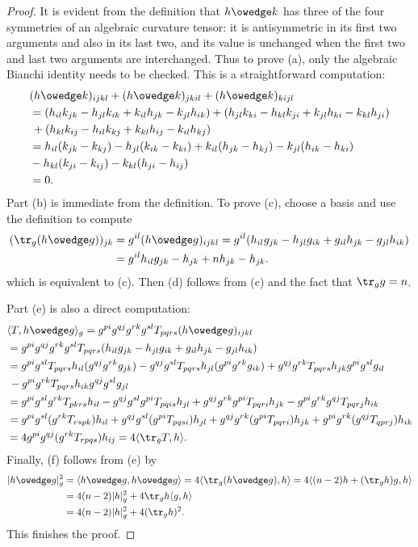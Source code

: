 \begin{proof}
It is evident from the definition that $h\owedge k$ has three of the four symmetries of an algebraic curvature tensor: it is antisymmetric in its first two arguments 
and also in its last two, and its value is unchanged when the first two and last two arguments are interchanged. Thus to prove (a), only the algebraic Bianchi 
identity needs to be checked. This is a straightforward computation:
\begin{align*}
&(h\owedge k)_{ijkl}+(h\owedge k)_{jkil}+(h\owedge k)_{kijl}\\
&=(h_{il}k_{jk}-h_{jl}k_{ik}+k_{il}h_{jk}-k_{jl}h_{ik})+(h_{jl}k_{ki}-h_{kl}k_{ji}+k_{jl}h_{ki}-k_{kl}h_{ji})\\
&\,+(h_{kl}k_{ij}-h_{il}k_{kj}+k_{kl}h_{ij}-k_{il}h_{kj})\\
&=h_{il}(k_{jk}-k_{kj})-h_{jl}(k_{ik}-k_{ki})+k_{il}(h_{jk}-h_{kj})-k_{jl}(h_{ik}-h_{ki})\\
&-h_{kl}(k_{ji}-k_{ij})-k_{kl}(h_{ji}-h_{ij})\\
&=0.
\end{align*}
Part (b) is immediate from the definition. To prove (c), choose a basis and use the definition to compute
\begin{align*}
(\tr_g(h\owedge g))_{jk}&=g^{il}(h\owedge g)_{ijkl}=g^{il}(h_{il}g_{jk}-h_{jl}g_{ik}+g_{il}h_{jk}-g_{jl}h_{ik})\\
&=g^{il}h_{il}g_{jk}-h_{jk}+nh_{jk}-h_{jk}.
\end{align*}
which is equivalent to (c). Then (d) follows from (c) and the fact that $\tr_gg=n$.\par
Part (e) is also a direct computation:
\begin{align*}
&\langle T,h\owedge g\rangle_g=g^{pi}g^{qj}g^{rk}g^{sl}T_{pqrs}(h\owedge g)_{ijkl}\\
&=g^{pi}g^{qj}g^{rk}g^{sl}T_{pqrs}(h_{il}g_{jk}-h_{jl}g_{ik}+g_{il}h_{jk}-g_{jl}h_{ik})\\
&=g^{pi}g^{sl}T_{pqrs}h_{il}(g^{qj}g^{rk}g_{jk})-g^{qj}g^{sl}T_{pqrs}h_{jl}(g^{pi}g^{rk}g_{ik})+g^{qj}g^{rk}T_{pqrs}h_{jk}g^{pi}g^{sl}g_{il}\\
&\,-g^{pi}g^{rk}T_{pqrs}h_{ik}g^{qj}g^{sl}g_{jl}\\
&=g^{pi}g^{sl}g^{rk}T_{pkrs}h_{il}-g^{qj}g^{sl}g^{pi}T_{pqis}h_{jl}+g^{qj}g^{rk}g^{pi}T_{pqri}h_{jk}-g^{pi}g^{rk}g^{qj}T_{pqrj}h_{ik}\\
&=g^{pi}g^{sl}(g^{rk}T_{rspk})h_{il}+g^{qj}g^{sl}(g^{pi}T_{pqsi})h_{jl}+g^{qj}g^{rk}(g^{pi}T_{pqri})h_{jk}+g^{pi}g^{rk}(g^{qj}T_{qprj})h_{ik}\\
&=4g^{pi}g^{qj}(g^{rk}T_{rpqs})h_{ij}=4\langle\tr_gT,h\rangle.
\end{align*}
Finally, (f) follows from (e) by
\begin{align*}
|h\owedge g|_g^2&=\langle h\owedge g,h\owedge g\rangle=4\langle\tr_g(h\owedge g),h\rangle=4\langle(n-2)h+(\tr_gh)g,h\rangle\\
&=4(n-2)|h|_g^2+4\tr_gh\langle g,h\rangle\\
&=4(n-2)|h|_g^2+4(\tr_gh)^2.
\end{align*}
This finishes the proof.
\end{proof}
